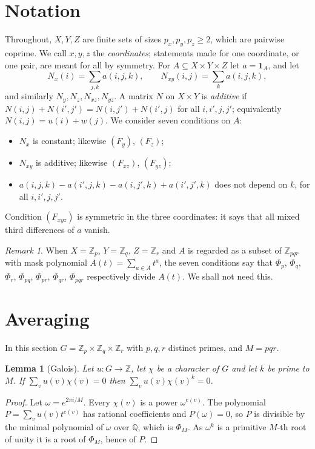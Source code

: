 \documentclass[11pt,a4paper]{amsart}
\newtheorem{lemma}[theorem]{Lemma}
\theoremstyle{definition}
\theoremstyle{remark}
\newtheorem{remark}[theorem]{Remark}
\newcommand{\Z}{\mathbb{Z}}
\newcommand{\Q}{\mathbb{Q}}
\newcommand{\one}{\mathbf{1}}
\begin{document}
\section{Notation}\label{sec:notation}

Throughout, $X,Y,Z$ are finite sets of sizes $p_x,p_y,p_z\ge 2$, which are pairwise coprime. We call $x,y,z$ the
\emph{coordinates}; statements made for one coordinate, or one pair, are meant for all by symmetry. For
$A\subseteq X\times Y\times Z$ let $a=\one_A$, and let
\[
 N_x(i)=\sum_{j,k}a(i,j,k),\qquad N_{xy}(i,j)=\sum_k a(i,j,k),
\]
and similarly $N_y,N_z,N_{xz},N_{yz}$. A matrix $N$ on $X\times Y$ is \emph{additive} if
$N(i,j)+N(i',j')=N(i,j')+N(i',j)$ for all $i,i',j,j'$; equivalently $N(i,j)=u(i)+w(j)$. We consider seven
conditions on $A$:
\begin{itemize}
\item[$(F_x)$] $N_x$ is constant; likewise $(F_y)$, $(F_z)$;
\item[$(F_{xy})$] $N_{xy}$ is additive; likewise $(F_{xz})$, $(F_{yz})$;
\item[$(F_{xyz})$] $a(i,j,k)-a(i',j,k)-a(i,j',k)+a(i',j',k)$ does not depend on $k$, for all $i,i',j,j'$.
\end{itemize}
Condition $(F_{xyz})$ is symmetric in the three coordinates: it says that all mixed third differences of $a$ vanish.

\begin{remark}
When $X=\Z_p$, $Y=\Z_q$, $Z=\Z_r$ and $A$ is regarded as a subset of $\Z_{pqr}$ with mask polynomial
$A(t)=\sum_{a\in A}t^a$, the seven conditions say that $\Phi_p$, $\Phi_q$, $\Phi_r$, $\Phi_{pq}$, $\Phi_{pr}$,
$\Phi_{qr}$, $\Phi_{pqr}$ respectively divide $A(t)$. We shall not need this.
\end{remark}

\section{Averaging}\label{sec:avg}

In this section $G=\Z_p\times\Z_q\times\Z_r$ with $p,q,r$ distinct primes, and $M=pqr$.

\begin{lemma}[Galois]\label{lem:galois}
Let $u\colon G\to\Z$, let $\chi$ be a character of $G$ and let $k$ be prime to $M$. If $\sum_v u(v)\chi(v)=0$ then
$\sum_v u(v)\chi(v)^k=0$.
\end{lemma}
\begin{proof}
Let $\omega=e^{2\pi i/M}$. Every $\chi(v)$ is a power $\omega^{e(v)}$. The polynomial $P=\sum_v u(v)t^{e(v)}$ has
rational coefficients and $P(\omega)=0$, so $P$ is divisible by the minimal polynomial of $\omega$ over $\Q$,
which is $\Phi_M$. As $\omega^k$ is a primitive $M$-th root of unity it is a root of $\Phi_M$, hence of $P$.
\end{proof}
\end{document}
